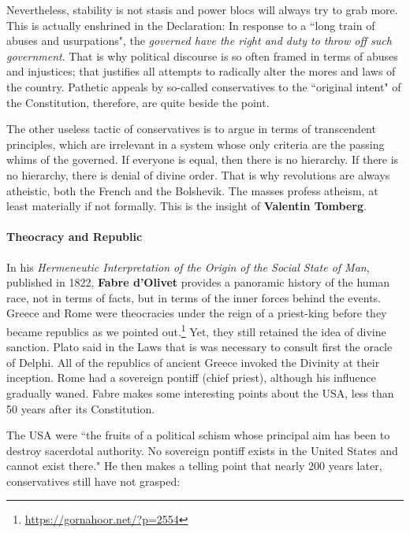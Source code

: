 Nevertheless, stability is not stasis and power blocs will always try to grab more. This is actually enshrined in the Declaration: In response to a ``long train of abuses and usurpations", the \emph{governed have the right and duty to throw off such government}. That is why political discourse is so often framed in terms of abuses and injustices; that justifies all attempts to radically alter the mores and laws of the country. Pathetic appeals by so-called conservatives to the ``original intent" of the Constitution, therefore, are quite beside the point.

The other useless tactic of conservatives is to argue in terms of transcendent principles, which are irrelevant in a system whose only criteria are the passing whims of the governed. If everyone is equal, then there is no hierarchy. If there is no hierarchy, there is denial of divine order. That is why revolutions are always atheistic, both the French and the Bolshevik. The masses profess atheism, at least materially if not formally. This is the insight of \textbf{Valentin Tomberg}.

\paragraph{Theocracy and Republic}
In his \textit{Hermeneutic Interpretation of the Origin of the Social State of Man}, published in 1822, \textbf{Fabre d'Olivet} provides a panoramic history of the human race, not in terms of facts, but in terms of the inner forces behind the events. Greece and Rome were theocracies under the reign of a priest-king before they became republics as we pointed out.\footnote{\url{https://gornahoor.net/?p=2554}} Yet, they still retained the idea of divine sanction. Plato said in the Laws that is was necessary to consult first the oracle of Delphi. All of the republics of ancient Greece invoked the Divinity at their inception. Rome had a sovereign pontiff (chief priest), although his influence gradually waned. Fabre makes some interesting points about the USA, less than 50 years after its Constitution.

The USA were ``the fruits of a political schism whose principal aim has been to destroy sacerdotal authority. No sovereign pontiff exists in the United States and cannot exist there." He then makes a telling point that nearly 200 years later, conservatives still have not grasped:

